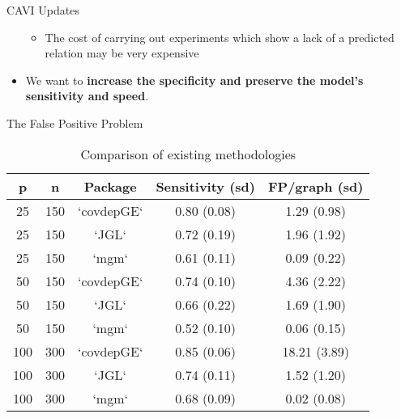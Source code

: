 \documentclass[
  ignorenonframetext,
]{beamer}
\providecommand{\tightlist}{%
  \setlength{\itemsep}{0pt}\setlength{\parskip}{0pt}}\usepackage{longtable,booktabs,array}
\begin{document}
\begin{frame}[fragile]{CAVI Updates}
\begin{itemize}
  \begin{itemize}
  \tightlist
  \item
    The cost of carrying out experiments which show a lack of a
    predicted relation may be very expensive
  \end{itemize}
\item
  We want to \textbf{increase the specificity and preserve the model's
  sensitivity and speed}.
\end{itemize}
\end{frame}

\begin{frame}{The False Positive Problem}
\protect\hypertarget{the-false-positive-problem}{}

\begin{table}[H]
\centering
\begin{tabular}{||c|c|c|c|c||}
  \hline
   p & n & Package & Sensitivity (sd) & FP/graph (sd) \\ 
  \hline 
   25 & 150 & `covdepGE` & 0.80 (0.08) & 1.29 (0.98) \\ 
   25 & 150 & `JGL`      & 0.72 (0.19) & 1.96 (1.92) \\ 
   25 & 150 & `mgm`      & 0.61 (0.11) & 0.09 (0.22) \\ 
   \hline
   50 & 150 & `covdepGE` & 0.74 (0.10) & 4.36 (2.22) \\ 
   50 & 150 & `JGL`      & 0.66 (0.22) & 1.69 (1.90) \\ 
   50 & 150 & `mgm`      & 0.52 (0.10) & 0.06 (0.15) \\ 
   \hline 
   100 & 300 & `covdepGE` & 0.85 (0.06) & 18.21 (3.89) \\ 
   100 & 300 & `JGL`      & 0.74 (0.11) & 1.52 (1.20) \\ 
   100 & 300 & `mgm`      & 0.68 (0.09) & 0.02 (0.08) \\
   \hline
\end{tabular}
\caption{Comparison of existing methodologies} 
\end{table}
\end{frame}
\end{document}
